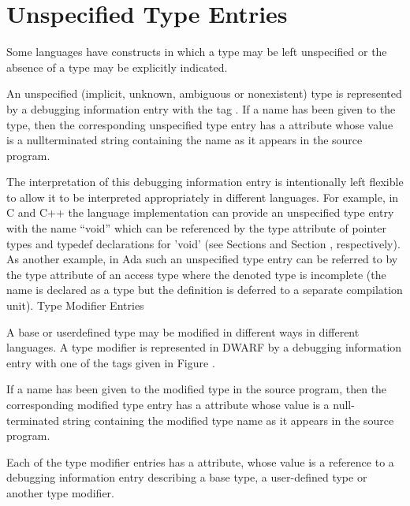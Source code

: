 \section{Unspecified Type Entries}
\label{chap:unspecifiedtypeentries}
Some languages have constructs in which a type may be left unspecified or the absence of a type
may be explicitly indicated.

An unspecified (implicit, unknown, ambiguous or nonexistent)
type is represented by a debugging information entry with
the tag . 
If a name has been given
to the type, then the corresponding unspecified type entry
has a  attribute whose value is a null\dash terminated
string containing the name as it appears in the source program.

The interpretation of this debugging information entry is
intentionally left flexible to allow it to be interpreted
appropriately in different languages. For example, in C and C++
the language implementation can provide an unspecified type
entry with the name “void” which can be referenced by the
type attribute of pointer types and typedef declarations for
'void' (see 
Sections  and 
Section , 
respectively). As another
example, in Ada such an unspecified type entry can be referred
to by the type attribute of an access type where the denoted
type is incomplete (the name is declared as a type but the
definition is deferred to a separate compilation unit). Type
Modifier Entries

A base or user\dash defined type may be modified in different ways
in different languages. A type modifier is represented in
DWARF by a debugging information entry with one of the tags
given in 
Figure .


If a name has been given to the modified type in the source
program, then the corresponding modified type entry has
a  attribute whose value is a null-terminated
string containing the modified type name as it appears in
the source program.

Each of the type modifier entries has a 
 attribute,
whose value is a reference to a debugging information entry
describing a base type, a user-defined type or another type
modifier.

